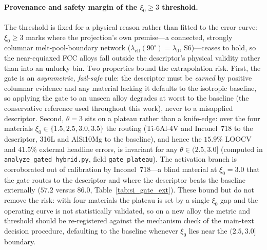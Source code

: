 \documentclass[11pt,a4paper,twocolumn]{article}
\providecommand{\ang}[1]{\ensuremath{#1^{\circ}}}
\begin{document}
\paragraph{Provenance and safety margin of the $\xi_0\ge3$ threshold.}
The threshold is fixed for a physical reason rather than fitted to the error curve: $\xi_0\ge3$ marks where the projection's own premise---a connected, strongly columnar melt-pool-boundary network ($\lambda_{\mathrm{eff}}(\ang{90})=\lambda_0$, S6)---ceases to hold, so the near-equiaxed FCC alloys fall outside the descriptor's physical validity rather than into an unlucky bin. Two properties bound the extrapolation risk. First, the gate is an \emph{asymmetric, fail-safe} rule: the descriptor must be \emph{earned} by positive columnar evidence and any material lacking it defaults to the isotropic baseline, so applying the gate to an unseen alloy degrades at worst to the baseline (the conservative reference used throughout this work), never to a misapplied descriptor. Second, $\theta=3$ sits on a plateau rather than a knife-edge: over the four materials $\xi_0\in\{1.5,2.5,3.0,3.5\}$ the routing (Ti-6Al-4V and Inconel~718 to the descriptor, 316L and AlSi10Mg to the baseline), and hence the $15.9\%$ LOOCV and $41.5\%$ external headline errors, is invariant for any $\theta\in(2.5,3.0]$ (computed in \texttt{analyze\_gated\_hybrid.py}, field \texttt{gate\_plateau}). The activation branch is corroborated out of calibration by Inconel~718---a blind material at $\xi_0=3.0$ that the gate routes to the descriptor and where the descriptor beats the baseline externally ($57.2$ versus $86.0$, Table~\ref{tab:si_gate_ext}). These bound but do not remove the risk: with four materials the plateau is set by a single $\xi_0$ gap and the operating curve is not statistically validated, so on a new alloy the metric and threshold should be re-registered against the mechanism check of the main-text decision procedure, defaulting to the baseline whenever $\xi_0$ lies near the $(2.5,3.0]$ boundary.
\end{document}
